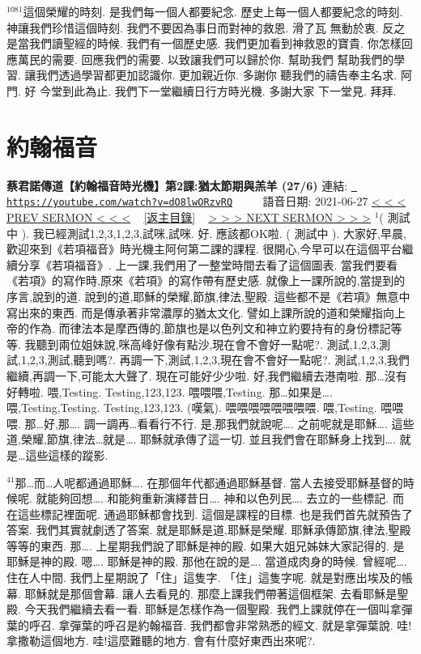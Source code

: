 \documentclass{book}
\begin{document}
$^{1081}$這個榮耀的時刻.
是我們每一個人都要紀念.
歷史上每一個人都要紀念的時刻.
神讓我們珍惜這個時刻.
我們不要因為事日而對神的救恩.
滑了瓦 無動於衷.
反之是當我們讀聖經的時候.
我們有一個歷史感.
我們更加看到神救恩的寶貴.
你怎樣回應萬民的需要.
回應我們的需要.
以致讓我們可以歸於你.
幫助我們 幫助我們的學習.
讓我們透過學習都更加認識你.
更加親近你.
多謝你 聽我們的禱告奉主名求.
阿門.
好 今堂到此為止.
我們下一堂繼續日行方時光機.
多謝大家 下一堂見.
拜拜.
\newpage



\section{約翰福音}
\label{sec:dO8lwORzvRQ}
\textbf{蔡君諾傳道【約翰福音時光機】第2課:猶太節期與羔羊 (27/6)}
\newline
\newline
連結: \href{https://youtube.com/watch?v=dO8lwORzvRQ}{\texttt{ https://youtube.com/watch?v=dO8lwORzvRQ}} ~~~~ 語音日期: 2021-06-27 
\newline
\newline
\hyperref[sec:SEh8cg_SNkc]{\small{< < < PREV SERMON < < <}}
~
\hyperref[sec:index]{\small{[返主目錄]}}
~
\hyperref[sec:V9Yc8B3k4jI]{\small{> > > NEXT SERMON > > >}}
\newline
\newline
$^{1}$( 測試中 ).
我已經測試1,2,3,1,2,3,試咪,試咪.
好.
應該都OK啦.
( 測試中 ).
大家好,早晨,歡迎來到《若項福音》時光機主阿何第二課的課程.
很開心,今早可以在這個平台繼續分享《若項福音》.
上一課,我們用了一整堂時間去看了這個圖表.
當我們要看《若項》的寫作時,原來《若項》的寫作帶有歷史感.
就像上一課所說的,當提到的序言,說到的道.
說到的道,耶穌的榮耀,節旗,律法,聖殿.
這些都不是《若項》無意中寫出來的東西.
而是傳承著非常濃厚的猶太文化.
譬如上課所說的道和榮耀指向上帝的作為.
而律法本是摩西傳的,節旗也是以色列文和神立約要持有的身份標記等等.
我聽到兩位姐妹說,咪高峰好像有點沙,現在會不會好一點呢?.
測試,1,2,3,測試,1,2,3,測試,聽到嗎?.
再調一下,測試,1,2,3,現在會不會好一點呢?.
測試,1,2,3,我們繼續,再調一下,可能太大聲了.
現在可能好少少啦.
好,我們繼續去港南啦.
那…沒有好轉啦.
喂,Testing.
Testing,123,123.
喂喂喂,Testing.
那…如果是….
喂,Testing,Testing.
Testing,123,123.
(嘆氣).
喂喂喂喂喂喂喂喂.
喂,Testing.
喂喂喂.
那…好,那….
調一調再…看看行不行.
是,那我們就說呢….
之前呢就是耶穌….
這些道,榮耀,節旗,律法…就是….
耶穌就承傳了這一切.
並且我們會在耶穌身上找到….
就是…這些這樣的蹤影.

$^{41}$那…而…人呢都通過耶穌….
在那個年代都通過耶穌基督.
當人去接受耶穌基督的時候呢.
就能夠回想….
和能夠重新演繹昔日….
神和以色列民….
去立的一些標記.
而在這些標記裡面呢.
通過耶穌都會找到.
這個是課程的目標.
也是我們首先就預告了答案.
我們其實就劇透了答案.
就是耶穌是道,耶穌是榮耀.
耶穌承傳節旗,律法,聖殿等等的東西.
那….
上星期我們說了耶穌是神的殿.
如果大姐兄姊妹大家記得的.
是耶穌是神的殿.
嗯….
耶穌是神的殿.
那他在說的是….
當道成肉身的時候.
曾經呢….
住在人中間.
我們上星期說了「住」這隻字.
「住」這隻字呢.
就是對應出埃及的帳幕.
耶穌就是那個會幕.
讓人去看見的.
那麼上課我們帶著這個框架.
去看耶穌是聖殿.
今天我們繼續去看一看.
耶穌是怎樣作為一個聖殿.
我們上課就停在一個叫拿彈葉的呼召.
拿彈葉的呼召是約翰福音.
我們都會非常熟悉的經文.
就是拿彈葉說.
哇!拿撒勒這個地方.
哇!這麼難聽的地方.
會有什麼好東西出來呢?.
\end{document}
